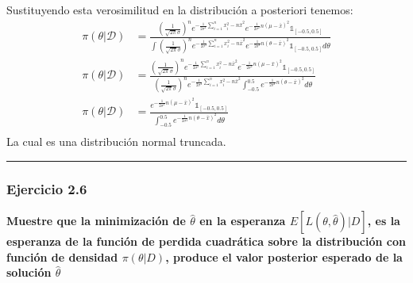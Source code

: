 \documentclass[12pt,]{article}
\begin{document}
Sustituyendo esta verosimilitud en la distribución a posteriori tenemos:
\[
\begin{array}{rl}
\pi(\theta|\mathcal{D}) & = \displaystyle \frac{\left( \frac{1}{\sqrt{2\pi}\sigma} \right)^n e^{-\frac{1}{2\sigma^2}\sum_{i=1}^n x_i^2 - n\bar x^2 }e^{-\frac{1}{2\sigma^2} n(\mu -\bar x)^2}\mathbb{1}_{[-0.5,0.5]}}{\int \left( \frac{1}{\sqrt{2\pi}\sigma} \right)^n e^{-\frac{1}{2\sigma^2}\sum_{i=1}^n x_i^2 - n\bar x^2 }e^{-\frac{1}{2\sigma^2} n(\theta -\bar x)^2}\mathbb{1}_{[-0.5,0.5]}d\theta}\\
\pi(\theta|\mathcal{D}) &= \displaystyle \frac{\left( \frac{1}{\sqrt{2\pi}\sigma} \right)^n e^{-\frac{1}{2\sigma^2}\sum_{i=1}^n x_i^2 - n\bar x^2 }e^{-\frac{1}{2\sigma^2} n(\mu -\bar x)^2}\mathbb{1}_{[-0.5,0.5]}}{\left( \frac{1}{\sqrt{2\pi}\sigma} \right)^n e^{-\frac{1}{2\sigma^2}\sum_{i=1}^n x_i^2 - n\bar x^2 }\int_{-0.5}^{0.5} e^{-\frac{1}{2\sigma^2} n(\theta -\bar x)^2}d\theta}\\
\pi(\theta|\mathcal{D}) &=\displaystyle \frac{e^{-\frac{1}{2\sigma^2} n(\mu -\bar x)^2}\mathbb{1}_{[-0.5,0.5]}}{\int_{-0.5}^{0.5} e^{-\frac{1}{2\sigma^2} n(\theta -\bar x)^2}d\theta}\\
\end{array}
\] La cual es una distribución normal truncada.

\begin{center}\rule{0.5\linewidth}{\linethickness}\end{center}

\subsubsection{Ejercicio 2.6}\label{ejercicio-2.6}

\textbf{Muestre que la minimización de \(\hat{\theta}\) en la esperanza
\(E[L(\theta,\hat{\theta})|D]\), es la esperanza de la función de
perdida cuadrática sobre la distribución con función de densidad
\(\pi(\theta|D)\), produce el valor posterior esperado de la solución
\(\hat\theta\)}
\end{document}
